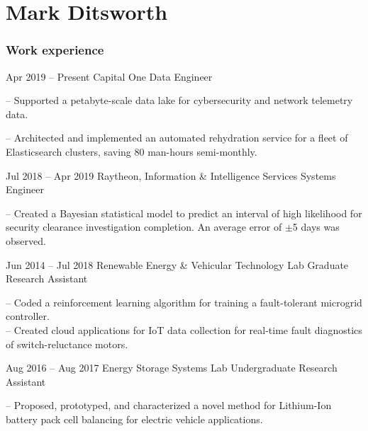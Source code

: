 \documentclass{tccv}
\begin{document}
\part{Mark Ditsworth}

\section{Work experience}

\begin{eventlist}

\item{Apr 2019 -- Present}
    {Capital One}
    {Data Engineer}
    
-- Supported a petabyte-scale data lake for cybersecurity and network telemetry data.

-- Architected and implemented an automated rehydration service for a fleet of Elasticsearch clusters, saving 80 man-hours semi-monthly.

\item{Jul 2018 -- Apr 2019}
    {Raytheon, Information \& Intelligence Services}
    {Systems Engineer}
    
-- Created a Bayesian statistical model to predict an interval of high
likelihood for security clearance investigation completion. An average
error of $\pm$5 days was observed.

\item{Jun 2014 -- Jul 2018}
     {Renewable Energy \& Vehicular Technology Lab}
     {Graduate Research Assistant}

-- Coded a reinforcement learning algorithm for training a fault-tolerant
microgrid controller.\\
-- Created cloud applications for IoT data collection for real-time fault diagnostics of switch-reluctance motors.

\item{Aug 2016 -- Aug 2017}
     {Energy Storage Systems Lab}
     {Undergraduate Research Assistant}

-- Proposed, prototyped, and characterized a novel method for Lithium-Ion battery pack cell balancing for electric vehicle applications.

\end{eventlist}
\vspace{-12pt}
\end{document}
